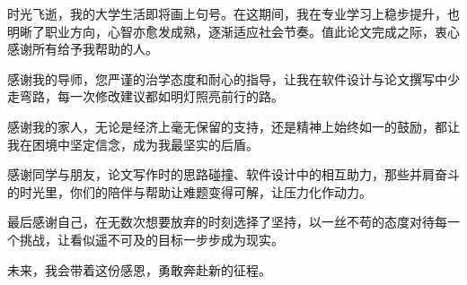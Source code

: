 时光飞逝，我的大学生活即将画上句号。在这期间，我在专业学习上稳步提升，也明晰了职业方向，心智亦愈发成熟，逐渐适应社会节奏。值此论文完成之际，衷心感谢所有给予我帮助的人。  

感谢我的导师，您严谨的治学态度和耐心的指导，让我在软件设计与论文撰写中少走弯路，每一次修改建议都如明灯照亮前行的路。  

感谢我的家人，无论是经济上毫无保留的支持，还是精神上始终如一的鼓励，都让我在困境中坚定信念，成为我最坚实的后盾。  

感谢同学与朋友，论文写作时的思路碰撞、软件设计中的相互助力，那些并肩奋斗的时光里，你们的陪伴与帮助让难题变得可解，让压力化作动力。  

最后感谢自己，在无数次想要放弃的时刻选择了坚持，以一丝不苟的态度对待每一个挑战，让看似遥不可及的目标一步步成为现实。  

未来，我会带着这份感恩，勇敢奔赴新的征程。
